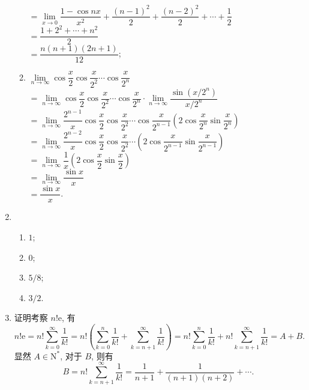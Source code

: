 \begin{enumerate}
\begin{enumerate}[(1)]
                $= \lim\limits_{x\to0} \dfrac{1 - \cos nx}{x^2} + \dfrac{(n-1)^2}{2} + \dfrac{(n-2)^2}{2} + \cdots + \dfrac12$ \\
                $= \dfrac{1 + 2^2 + \cdots + n^2}{2}$ \\
                $= \dfrac{n(n+1)(2n+1)}{12}$;
            \item %
                $\lim\limits_{n\to\infty}\cos\dfrac{x}{2}\cos\dfrac{x}{2^2}\cdots\cos\dfrac{x}{2^n}$ \\
                $= \lim\limits_{n\to\infty}\cos\dfrac{x}{2}\cos\dfrac{x}{2^2}\cdots\cos\dfrac{x}{2^n} \cdot \lim\limits_{n\to\infty} \dfrac{\sin(x/2^n)}{x/2^n}$ \\
                $= \lim\limits_{n\to\infty} \dfrac{2^{n-1}}{x} \cos\dfrac{x}{2} \cos\dfrac{x}{2^2} \cdots \cos\dfrac{x}{2^{n-1}}\left(2\cos\dfrac{x}{2^n}\sin\dfrac{x}{2^n}\right)$ \\
                $= \lim\limits_{n\to\infty} \dfrac{2^{n-2}}{x} \cos\dfrac{x}{2} \cos\dfrac{x}{2^2} \cdots \left(2\cos\dfrac{x}{2^{n-1}}\sin\dfrac{x}{2^{n-1}}\right)$ \\
                $= \lim\limits_{n\to\infty} \dfrac1x\left(2\cos\dfrac{x}{2}\sin\dfrac{x}{2}\right)$ \\
                $= \lim\limits_{n\to\infty} \dfrac{\sin x}{x}$ \\
                $= \dfrac{\sin x}{x}$.
        \end{enumerate}
    \item %
        \begin{enumerate}[(1)]
            \item %
                $1$;
            \item %
                $0$;
            \item %
                $5/8$;
            \item %
                $3/2$.
        \end{enumerate}
    \item %
        {\heiti 证明}\quad 考察 $n!\mathrm{e}$, 有
        \[
            n!\mathrm{e} = n! \sum_{k=0}^\infty\frac{1}{k!} = n!\left(\sum_{k=0}^n\frac{1}{k!} + \sum_{k=n+1}^\infty\frac{1}{k!}\right) = n! \sum_{k=0}^n\frac{1}{k!} + n!\sum_{k=n+1}^\infty\frac{1}{k!} = A + B.
        \]
        显然 $A \in \mathrm{N}^*$, 对于 $B$, 则有
        \[
            B = n!\sum_{k=n+1}^\infty\frac{1}{k!} = \frac{1}{n+1} + \frac{1}{(n+1)(n+2)} + \cdots.    
        \]
        

\end{enumerate}
